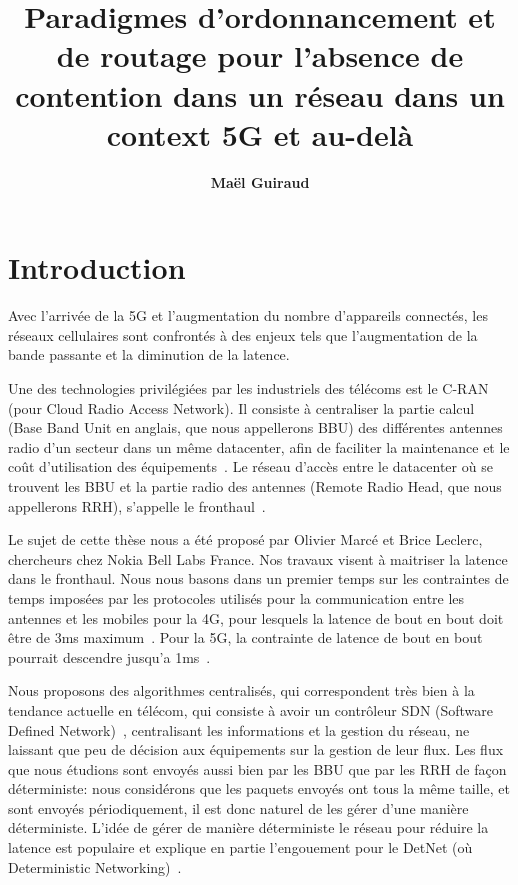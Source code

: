\documentclass{article}
\begin{document}
\title{Paradigmes d'ordonnancement et de routage pour l'absence de contention dans un réseau dans un context 5G et au-delà}
 

\newcommand{\todo}[1]{{\color{red} TODO: {#1}}}


\author[1,2]{\bf{ {Ma\"el Guiraud}}}



\maketitle

\section*{Introduction}

Avec l'arrivée de la 5G et l'augmentation du nombre d'appareils connectés, les réseaux cellulaires sont confrontés à des enjeux tels que l'augmentation de la bande passante et la diminution de la latence.

Une des technologies privilégiées par les industriels des télécoms est le C-RAN (pour Cloud Radio Access Network). Il consiste à centraliser la partie calcul (Base Band Unit en anglais, que nous appellerons BBU) des différentes antennes radio d'un secteur dans un même datacenter, afin de faciliter la maintenance et le coût d'utilisation des équipements~\cite{mobile2011c}. Le réseau d'accès entre le datacenter où se trouvent les BBU et la partie radio des antennes (Remote Radio Head, que nous appellerons RRH), s'appelle le fronthaul~\cite{ieeep802}. 

Le sujet de cette thèse nous a été proposé par Olivier Marcé et Brice Leclerc, chercheurs chez Nokia Bell Labs France. Nos travaux visent à maitriser la latence dans le fronthaul. Nous nous basons dans un premier temps sur les contraintes de temps imposées par les protocoles utilisés pour la communication entre les antennes et les mobiles pour la 4G, pour lesquels la latence de bout en bout doit être de 3ms maximum~\cite{bouguen2012lte}.  Pour la 5G, la contrainte de latence de bout en bout pourrait descendre jusqu'a 1ms~\cite{boccardi2014five}.

Nous proposons des algorithmes centralisés, qui correspondent très bien à la tendance actuelle en télécom, qui consiste à avoir un contrôleur SDN (Software Defined Network)~\cite{haleplidis2015software}, centralisant les informations et la gestion du réseau, ne laissant que peu de décision aux équipements sur la gestion de leur flux. Les flux que nous étudions sont envoyés aussi bien par les BBU que par les RRH de façon déterministe: nous considérons que les paquets envoyés ont tous la même taille, et sont envoyés périodiquement, il est donc naturel de les gérer d'une manière déterministe. L'idée de gérer de manière déterministe le réseau pour réduire la latence est populaire et explique en partie l'engouement pour le DetNet (où Deterministic Networking)~\cite{finn-detnet-architecture-08}.
\end{document}
